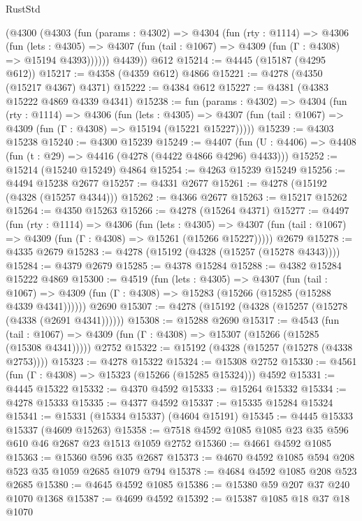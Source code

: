 \begin{lexlean}{RustStd}
\begin{coremodule}
      (@4300
        (@4303
          (fun (params : @4302) =>
          @4304
            (fun (rty : @1114) =>
            @4306
              (fun (lets : @4305) =>
              @4307 (fun (tail : @1067) => @4309 (fun (Γ : @4308) => @15194 @4393))))))
        @4439))
    @612
@15214 := @4445 (@15187 (@4295 @612))
@15217 := @4358 (@4359 @612) @4866
@15221 := @4278 (@4350 (@15217 @4367) @4371)
@15222 := @4384 @612
@15227 := @4381 (@4383 @15222 @4869 @4339 @4341)
@15238 := fun (params : @4302) =>
  @4304
    (fun (rty : @1114) =>
    @4306
      (fun (lets : @4305) =>
      @4307 (fun (tail : @1067) => @4309 (fun (Γ : @4308) => @15194 (@15221 @15227)))))
@15239 := @4303 @15238
@15240 := @4300 @15239
@15249 := @4407
    (fun (U : @4406) => @4408 (fun (t : @29) => @4416 (@4278 (@4422 @4866 @4296) @4433)))
@15252 := @15214 (@15240 @15249) @4864
@15254 := @4263 @15239 @15249
@15256 := @4494 @15238 @2677
@15257 := @4331 @2677
@15261 := @4278 (@15192 (@4328 (@15257 @4344)))
@15262 := @4366 @2677
@15263 := @15217 @15262
@15264 := @4350 @15263
@15266 := @4278 (@15264 @4371)
@15277 := @4497
    (fun (rty : @1114) =>
    @4306
      (fun (lets : @4305) =>
      @4307 (fun (tail : @1067) => @4309 (fun (Γ : @4308) => @15261 (@15266 @15227)))))
    @2679
@15278 := @4335 @2679
@15283 := @4278 (@15192 (@4328 (@15257 (@15278 @4343))))
@15284 := @4379 @2679
@15285 := @4378 @15284
@15288 := @4382 @15284 @15222 @4869
@15300 := @4519
    (fun (lets : @4305) =>
    @4307
      (fun (tail : @1067) =>
      @4309 (fun (Γ : @4308) => @15283 (@15266 (@15285 (@15288 @4339 @4341))))))
    @2690
@15307 := @4278 (@15192 (@4328 (@15257 (@15278 (@4338 (@2691 @4341))))))
@15308 := @15288 @2690
@15317 := @4543
    (fun (tail : @1067) => @4309 (fun (Γ : @4308) => @15307 (@15266 (@15285 (@15308 @4341)))))
    @2752
@15322 := @15192 (@4328 (@15257 (@15278 (@4338 @2753))))
@15323 := @4278 @15322
@15324 := @15308 @2752
@15330 := @4561 (fun (Γ : @4308) => @15323 (@15266 (@15285 @15324))) @4592
@15331 := @4445 @15322
@15332 := @4370 @4592
@15333 := @15264 @15332
@15334 := @4278 @15333
@15335 := @4377 @4592
@15337 := @15335 @15284 @15324
@15341 := @15331 (@15334 @15337) (@4604 @15191)
@15345 := @4445 @15333 @15337 (@4609 @15263)
@15358 := @7518 @4592 @1085 @1085 @23 @35 @596 @610 @46 @2687 @23 @1513 @1059 @2752
@15360 := @4661 @4592 @1085
@15363 := @15360 @596 @35 @2687
@15373 := @4670 @4592 @1085 @594 @208 @523 @35 @1059 @2685 @1079 @794
@15378 := @4684 @4592 @1085 @208 @523 @2685
@15380 := @4645 @4592 @1085
@15386 := @15380 @59 @207 @37 @240 @1070 @1368
@15387 := @4699 @4592
@15392 := @15387 @1085 @18 @37 @18 @1070

\end{coremodule}
\end{lexlean}
